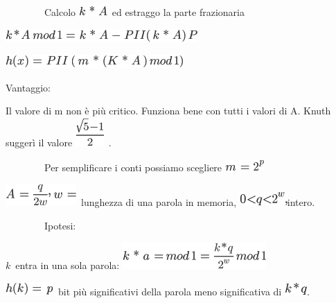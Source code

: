\documentclass{article}
\begin{document}
{{~~~~~~~~Calcolo }\includegraphics{images/image262.png}{~ed estraggo la
parte frazionaria}

\includegraphics{images/image263.png}

\includegraphics{images/image264.png}

{}

{Vantaggio:}

{Il valore di m non è più critico. Funziona bene con tutti i valori di
A. Knuth suggerì il valore }\includegraphics{images/image265.png}{~.}

{}

{~~~~~~~~Per semplificare i conti possiamo scegliere
}\includegraphics{images/image266.png}

\includegraphics{images/image267.png}{~lunghezza di una parola in memoria, }\includegraphics{images/image268.png}{intero.}

{}

{~~~~~~~~Ipotesi:}

$k${~entra in una sola parola: }\includegraphics{images/image269.png}

\includegraphics{images/image270.png}{~bit più significativi della parola meno significativa di
}\includegraphics{images/image271.png}{.}



}
\end{document}
